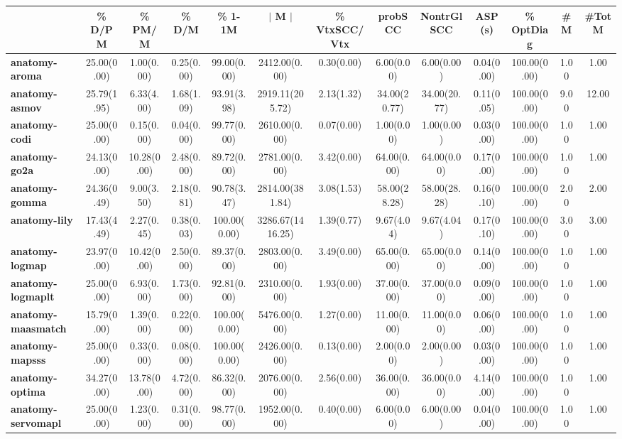 \begin{tabular}{|l|c|c|c|c|c|c|c|c|c|c|c|c|}
\hline
&\textbf{\% D/PM}&\textbf{\% PM/M}&\textbf{\% D/M}&\textbf{\% 1-1M}&\textbf{$\vert$ M $\vert$}&\textbf{\% VtxSCC/Vtx}&\textbf{probSCC}&\textbf{NontrGlSCC}&\textbf{ASP (s)}&\textbf{\% OptDiag}&\textbf{\#M}&\textbf{\#TotM}\\\hline
\textbf{anatomy-aroma}&25.00(0.00)&1.00(0.00)&0.25(0.00)&99.00(0.00)&2412.00(0.00)&0.30(0.00)&6.00(0.00)&6.00(0.00)&0.04(0.00)&100.00(0.00)&1.00&1.00\\\hline
\textbf{anatomy-asmov}&25.79(1.95)&6.33(4.00)&1.68(1.09)&93.91(3.98)&2919.11(205.72)&2.13(1.32)&34.00(20.77)&34.00(20.77)&0.11(0.05)&100.00(0.00)&9.00&12.00\\\hline
\textbf{anatomy-codi}&25.00(0.00)&0.15(0.00)&0.04(0.00)&99.77(0.00)&2610.00(0.00)&0.07(0.00)&1.00(0.00)&1.00(0.00)&0.03(0.00)&100.00(0.00)&1.00&1.00\\\hline
\textbf{anatomy-go2a}&24.13(0.00)&10.28(0.00)&2.48(0.00)&89.72(0.00)&2781.00(0.00)&3.42(0.00)&64.00(0.00)&64.00(0.00)&0.17(0.00)&100.00(0.00)&1.00&1.00\\\hline
\textbf{anatomy-gomma}&24.36(0.49)&9.00(3.50)&2.18(0.81)&90.78(3.47)&2814.00(381.84)&3.08(1.53)&58.00(28.28)&58.00(28.28)&0.16(0.10)&100.00(0.00)&2.00&2.00\\\hline
\textbf{anatomy-lily}&17.43(4.49)&2.27(0.45)&0.38(0.03)&100.00(0.00)&3286.67(1416.25)&1.39(0.77)&9.67(4.04)&9.67(4.04)&0.17(0.10)&100.00(0.00)&3.00&3.00\\\hline
\textbf{anatomy-logmap}&23.97(0.00)&10.42(0.00)&2.50(0.00)&89.37(0.00)&2803.00(0.00)&3.49(0.00)&65.00(0.00)&65.00(0.00)&0.14(0.00)&100.00(0.00)&1.00&1.00\\\hline
\textbf{anatomy-logmaplt}&25.00(0.00)&6.93(0.00)&1.73(0.00)&92.81(0.00)&2310.00(0.00)&1.93(0.00)&37.00(0.00)&37.00(0.00)&0.09(0.00)&100.00(0.00)&1.00&1.00\\\hline
\textbf{anatomy-maasmatch}&15.79(0.00)&1.39(0.00)&0.22(0.00)&100.00(0.00)&5476.00(0.00)&1.27(0.00)&11.00(0.00)&11.00(0.00)&0.06(0.00)&100.00(0.00)&1.00&1.00\\\hline
\textbf{anatomy-mapsss}&25.00(0.00)&0.33(0.00)&0.08(0.00)&100.00(0.00)&2426.00(0.00)&0.13(0.00)&2.00(0.00)&2.00(0.00)&0.03(0.00)&100.00(0.00)&1.00&1.00\\\hline
\textbf{anatomy-optima}&34.27(0.00)&13.78(0.00)&4.72(0.00)&86.32(0.00)&2076.00(0.00)&2.56(0.00)&36.00(0.00)&36.00(0.00)&4.14(0.00)&100.00(0.00)&1.00&1.00\\\hline
\textbf{anatomy-servomapl}&25.00(0.00)&1.23(0.00)&0.31(0.00)&98.77(0.00)&1952.00(0.00)&0.40(0.00)&6.00(0.00)&6.00(0.00)&0.04(0.00)&100.00(0.00)&1.00&1.00\\\hline

\end{tabular}
